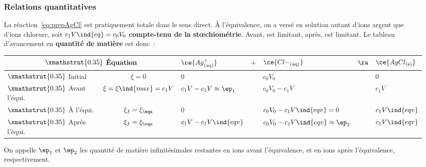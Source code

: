 \documentclass[../main/main.tex]{subfiles}
\begin{document}
{\subsubsection{Relations quantitatives}
La réaction~\eqref{eq:prepAgCl} est pratiquement totale dans le sens direct. À
l'équivalence, on a versé en solution autant d'ions argent que d'ions chlorure,
soit $c_1V\ind{eq} = c_0V_0$ \textbf{compte-tenu de la stœchiométrie}. Avant,
 est limitant, après,  est limitant. Le tableau d'avancement
en \textbf{quantité de matière} est donc~:
\begin{center}
	\def\rhgt{0.35}
	\centering
	\begin{tabularx}{\linewidth}{|l|c||YdYdY|}
		\hline
		\multicolumn{2}{|c||}{
			$\xmathstrut{\rhgt}$
		\textbf{Équation}}                     &
		$\ce{{Ag}^+_{\rm(aq)}}$                & $+$                         &
		$\ce{{Cl-}_{\rm(aq)}}$                 & $\ra$                       &
		$\ce{AgCl_{\rm(s)}}$                                                   \\
		\hline
		$\xmathstrut{\rhgt}$
		Initial                                & $\xi = 0$                   &
		$0$                                    & \vline                      &
		$c_0V_0$                               & \vline                      &
		$0$                                                                    \\
		\hline
		$\xmathstrut{\rhgt}$
		Avant l'équi.                          & $\xi = \xi\ind{max} = c_1V$ &
		$c_1V - c_1V \approx \ep_1$            & \vline                      &
		$c_0V_0 - c_1V$                        & \vline                      &
		$c_1V$                                                                 \\
		\hline
		$\xmathstrut{\rhgt}$
		À l'équi.                              & $\xi_f = \xi_{\equ}$        &
		$0$                                    & \vline                      &
		$c_0V_0 - c_1V\ind{eqv} = 0$           & \vline                      &
		$c_1V\ind{eqv}$                                                        \\
		\hline
		$\xmathstrut{\rhgt}$
		Après l'équi.                          & $\xi_f = \xi_{\equ}$        &
		$c_1V - c_1V\ind{eqv}$                 & \vline                      &
		$c_0V_0 - c_1V\ind{eqv} \approx \ep_2$ & \vline                      &
		$c_1V\ind{eqv}$                                                        \\
		\hline
	\end{tabularx}
\end{center}
On appelle $\ep_1$ et $\ep_2$ les quantité de matière infinitésimales restantes
en ions  avant l'équivalence, et en ions  après l'équivalence,
respectivement.

}
\end{document}
